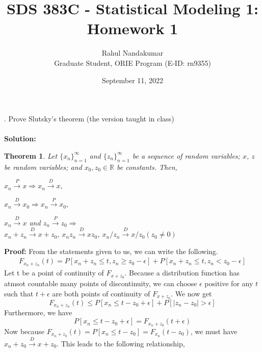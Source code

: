 \documentclass[11pt]{article}
\title{SDS 383C - Statistical Modeling 1: Homework 1}
\author{Rahul Nandakumar \\ Graduate Student, ORIE Program (E-ID: rn9355)}
\date{September 11, 2022}
\newtheorem{theorem}{Theorem}
\begin{document}
\maketitle
{}. Prove Slutsky’s theorem (the version taught in class)\\ \\
\textbf{Solution:}
\begin{theorem}
  Let $\{x_{n}\}_{n = 1}^{\infty}$ and $\{z_{n}\}_{n = 1}^{\infty}$ be a sequence of random variables; $x$, $z$ be random variables; and $x_{0}, z_{0} \in \mathbb{R}$ be constants. Then,
  \begin{compactitem}
    \item $x_{n} \xrightarrow{P} x \Rightarrow x_{n} \xrightarrow{D} x,$
    \item $x_{n} \xrightarrow{D} x_{0} \Rightarrow x_{n} \xrightarrow{P} x_{0},$
    \item $x_{n} \xrightarrow{D} x$ and $z_{n} \xrightarrow{P} z_{0} \Rightarrow $\\
    $x_{n} + z_{n} \xrightarrow{D} x + z_{0}$, $x_{n}z_{n} \xrightarrow{D} xz_{0}$, $x_{n}/z_{n} \xrightarrow{D} x/z_{0} (z_{0} \neq 0)$
  \end{compactitem}
\end{theorem}
\textbf{Proof:}
From the statements given to us, we can write the following.
\begin{equation}
  \nonumber
  \begin{aligned}
    F_{x_{n} + z_{n}}(t) = P[x_{n} + z_{n} \leq t, z_{n} \geq z_{0} - \epsilon] + P[x_{n} + z_{n} \leq t, z_{n} < z_{0} - \epsilon]
  \end{aligned}
\end{equation}
Let t be a point of continuity of $F_{x + z_{0}}$. Because a distribution function has atmsot countable many points of discontinuity, we can choose $\epsilon$ positive for any $t$ such that $t +  \epsilon$ are both points of continuity of $F_{x + z_{0}}$. We now get
\begin{equation}
  \nonumber
  F_{x_{n} + z_{n}}(t) \leq P[x_{n}  \leq t - z_{0} + \epsilon] + P[ \lvert z_{n} - z_{0} \rvert > \epsilon]
\end{equation}
Furthermore, we have
\begin{equation}
  \nonumber
  P[x_{n}  \leq t - z_{0} + \epsilon] = F_{x_{n} + z_{0}}(t + \epsilon)
\end{equation}
Now because $F_{x_{n} + z_{0}}(t) = P[x_{n}  \leq t - z_{0}] = F_{x_{n}}(t - z_{0}) $, we must have $x_{n} + z_{0} \xrightarrow{D} x + z_{0}$. This leads to the following relationship,
\end{document}
